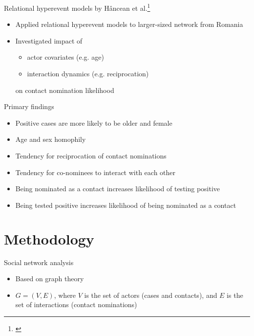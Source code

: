 \documentclass{beamer}
\begin{document}
	\begin{frame}{Relational hyperevent models by H\^ancean et al.\footnote{\cite{hancean2021role,hancean2022occupations}}}
		\begin{itemize}
			\item Applied relational hyperevent models to larger-sized network from Romania
			\item Investigated impact of 
			\begin{itemize}
				\item actor covariates (e.g. age)
				\item interaction dynamics (e.g. reciprocation)
			\end{itemize}
			on contact nomination likelihood
		\end{itemize}
	\end{frame}

	\begin{frame}{Primary findings}
		\begin{itemize}
			\item Positive cases are more likely to be older and female
			\item Age and sex homophily
			\item Tendency for reciprocation of contact nominations
			\item Tendency for co-nominees to interact with each other
			\item Being nominated as a contact increases likelihood of testing positive
			\item Being tested positive increases likelihood of being nominated as a contact
		\end{itemize}
	\end{frame}
	
	\section{Methodology}
	
	\begin{frame}{Social network analysis}
		\begin{itemize}
			\item Based on graph theory
			\item $G = (V,E)$, where $V$ is the set of actors (cases and contacts), and $E$ is the set of interactions (contact nominations)
		\end{itemize}
	\end{frame}
\end{document}
